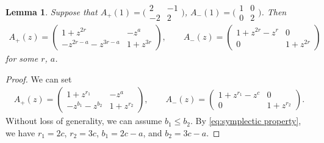 \documentclass[pdftex]{sigma}
\numberwithin{equation}{section}
\newtheorem{Lemma}[Theorem]{Lemma}
\theoremstyle{definition}
\begin{document}
\begin{Lemma}\label{lemma:Apm(z) 5}
 Suppose that
$
 A_{+}(1) =
 \bigl( \begin{smallmatrix}
 2 & - 1 \\
 -2 & 2
 \end{smallmatrix}\bigr)$, $
 A_{-}(1) =
 \bigl( \begin{smallmatrix}
 1 & 0 \\
 0 & 2
 \end{smallmatrix}\bigr)$.
 Then
 \begin{align*}
 A_{+}(z) =
 \begin{pmatrix}
 1+z^{2r} & - z^a \\
 -z^{2r-a}-z^{3r-a} & 1+z^{3r}
 \end{pmatrix},\qquad
 A_{-}(z) =
 \begin{pmatrix}
 1+z^{2r}-z^r & 0 \\
 0 & 1+z^{2r}
 \end{pmatrix}
 \end{align*}
 for some $r$, $a$.
\end{Lemma}
\begin{proof}
 We can set
 \begin{align*}
 A_{+}(z) =
 \begin{pmatrix}
 1+z^{r_1} & - z^a \\
 -z^{b_1}-z^{b_2} & 1+z^{r_2}
 \end{pmatrix},\qquad
 A_{-}(z) =
 \begin{pmatrix}
 1+z^{r_1}-z^c & 0 \\
 0 & 1+z^{r_2}
 \end{pmatrix}.
 \end{align*}
 Without loss of generality, we can assume $b_1 \leq b_2$.
 By \eqref{eq:symplectic property},
 we have $r_1=2c$, $r_2=3c$, $b_1 = 2c-a$, and $b_2=3c-a$.
\end{proof}
\end{document}
